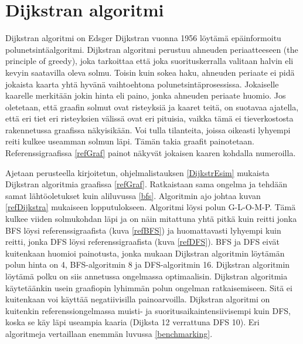 \section{Dijkstran algoritmi}\label{dijkstra}
Dijkstran algoritmi on Edsger Dijkstran vuonna 1956 löytämä epäinformoitu 
polunetsintäalgoritmi.\cite{applSciLawande} Dijkstran algoritmi perustuu 
ahneuden periaatteeseen (the principle of greedy), joka tarkoittaa että joka 
suorituskerralla valitaan halvin eli kevyin saatavilla oleva 
solmu.\cite{mazeGameTrilogi} Toisin kuin sokea haku, ahneuden periaate ei pidä 
jokaista kaarta yhtä hyvänä vaihtoehtona polunetsintäprosessissa. Jokaiselle 
kaarelle merkitään jokin hinta eli paino, jonka ahneuden periaate huomio. Jos 
oletetaan, että graafin solmut ovat risteyksiä ja kaaret teitä, on suotavaa 
ajatella, että eri tiet eri risteyksien välissä ovat eri pituisia, vaikka tämä 
ei tieverkostosta rakennetussa graafissa näkyisikään. Voi tulla tilanteita, 
joissa oikeasti lyhyempi reiti kulkee useamman solmun läpi. Tämän takia 
graafit painotetaan. Referenssigraafissa \ref{refGraf} painot näkyvät jokaisen 
kaaren kohdalla numeroilla. \par
	Ajetaan \textcite{applSciLawande} perusteella kirjoitetun, 
ohjelmalistauksen \ref{DijkstrEsim} mukaista Dijkstran algoritmia graafissa 
\ref{refGraf}. Ratkaistaan sama ongelma ja tehdään samat lähtöoletukset kuin 
aliluvussa \ref{bfs}. Algoritmin ajo johtaa kuvan \ref{refDijkstra} mukaiseen 
lopputulokseen. Algoritmi löysi polun G-L-O-M-P. Tämä kulkee viiden 
solmukohdan läpi ja on näin mitattuna yhtä pitkä kuin reitti jonka BFS löysi 
referenssigraafista (kuva \ref{refBFS}) ja huomattavasti lyhyempi kuin 
reitti, jonka DFS löysi referenssigraafista (kuva \ref{refDFS}). BFS ja DFS 
eivät kuitenkaan huomioi painotusta, jonka mukaan Dijkstran algoritmin 
löytämän polun hinta on 4, BFS-algoritmin 8 ja DFS-algoritmin 16. Dijkstran 
algoritmin löytämä polku on siis annetussa ongelmassa optimaalisin. Dijkstran 
algoritmia käytetäänkin usein graafiopin lyhimmän polun ongelman 
ratkaisemiseen.\cite{IOPDijkstra} Sitä ei kuitenkaan voi käyttää 
negatiivisilla painoarvoilla.\cite{applSciLawande} Dijkstran algoritmi on 
kuitenkin referenssiongelmassa muisti- ja suoritusaikaintensiivisempi kuin 
DFS, koska se käy läpi useampia kaaria (Dijksta 12 verrattuna DFS 10). Eri 
algoritmeja vertaillaan enemmän luvussa \ref{benchmarking}.

